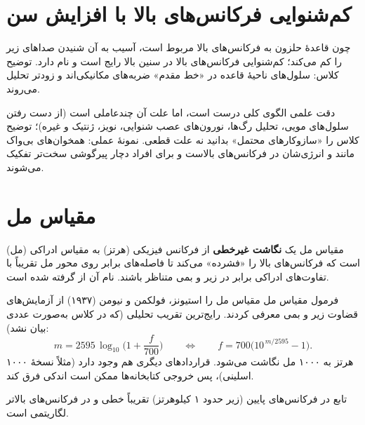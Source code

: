 \section{کم‌شنوایی فرکانس‌های بالا با افزایش سن}

چون قاعدهٔ حلزون به فرکانس‌های بالا مربوط است، آسیب به آن شنیدن صداهای زیر را کم می‌کند؛ کم‌شنوایی فرکانس‌های بالا در سنین بالا رایج است و  نام دارد. توضیح کلاس: سلول‌های ناحیهٔ قاعده در «خط مقدم» ضربه‌های مکانیکی‌اند و زودتر تحلیل می‌روند.

\begin{correctionbox}{دقت علمی}
الگوی کلی درست است، اما علت آن چندعاملی است (از دست رفتن سلول‌های مویی، تحلیل رگ‌ها، نورون‌های عصب شنوایی، نویز، ژنتیک و غیره)؛ توضیح کلاس را «سازوکارهای محتمل» بدانید نه علت قطعی. نمونهٔ عملی: همخوان‌های بی‌واک مانند  و  انرژی‌شان در فرکانس‌های بالاست و برای افراد دچار پیرگوشی سخت‌تر تفکیک می‌شوند.
\end{correctionbox}

\section{مقیاس مل}

\begin{definitionbox}{مقیاس مل}
 یک \textbf{نگاشت غیرخطی} از فرکانس فیزیکی (هرتز) به مقیاس ادراکی (مل) است که فرکانس‌های بالا را «فشرده» می‌کند تا فاصله‌های برابر روی محور مل تقریباً با تفاوت‌های ادراکی برابر در زیر و بمی متناظر باشند. نام آن از  گرفته شده است.
\end{definitionbox}

\begin{correctionbox}{فرمول مقیاس مل}
مقیاس مل را استیونز، فولکمن و نیومن (۱۹۳۷) از آزمایش‌های قضاوت زیر و بمی معرفی کردند. رایج‌ترین تقریب تحلیلی (که در کلاس به‌صورت عددی بیان نشد):
\[
m = 2595\,\log_{10}\!\Big(1+\frac{f}{700}\Big)
\qquad\Longleftrightarrow\qquad
f = 700\big(10^{\,m/2595}-1\big).
\]
۱۰۰۰ هرتز به ۱۰۰۰ مل نگاشت می‌شود. قراردادهای دیگری هم وجود دارد (مثلاً نسخهٔ اسلینی)، پس خروجی کتابخانه‌ها ممکن است اندکی فرق کند.
\end{correctionbox}

تابع در فرکانس‌های پایین (زیر حدود ۱ کیلوهرتز) تقریباً خطی و در فرکانس‌های بالاتر لگاریتمی است.

